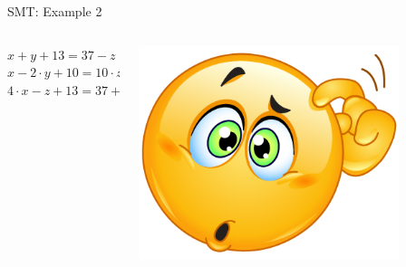 \documentclass[10pt, compress]{beamer}
\begin{document}
\begin{frame}{SMT: Example 2}

	\begin{columns}
		\begin{column}{0.7\textwidth}
			\huge{$ x+y+13=37-z $} \\
			\huge{$ x-2 \cdot y+10=10 \cdot z $} \\
			\huge{$ 4\cdot x-z+13=37+y $} \\
		\end{column}
		\begin{column}{0.3\textwidth}
			\includegraphics[width=0.8\textwidth]{images/thinking.png}
		\end{column}
	\end{columns} 
	
\end{frame}
\end{document}
